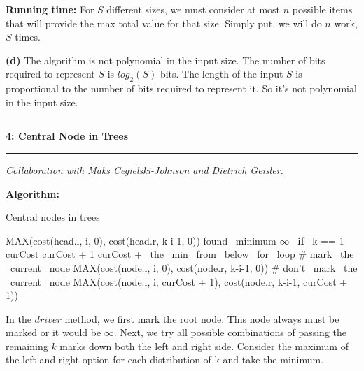 \documentclass[11pt]{article}
\newcommand\question[2]{\vspace{.25in}\hrule\textbf{#1: #2}\vspace{.5em}\hrule\vspace{.10in}}
\renewcommand\part[1]{\vspace{.10in}\textbf{(#1)}}
\newcommand\algorith{\vspace{.10in}\textbf{Algorithm: }}
\newcommand\runtime{\vspace{.10in}\textbf{Running time: }}
\begin{document}
\runtime For $S$ different sizes, we must consider at most $n$ possible items that will provide the max total value for that size. Simply put, we will do $n$ work, $S$ times.


\part{d} The algorithm is not polynomial in the input size. The number of bits required to represent $S$ is $log_2(S)$ bits. The length of the input $S$ is proportional to the number of bits required to represent it. So it's not polynomial in the input size.


\question{4}{Central Node in Trees}
\textit{Collaboration with Maks Cegielski-Johnson and Dietrich Geisler.}

\algorith

\begin{algorithm}[H]
\caption{Central nodes in trees}
\label{CHalgorithm}
\begin{algorithmic}[1]
	\State MAX(cost(head.l, i, 0), cost(head.r, k-i-1, 0))
\EndFor
\State \Return found \ minimum
\EndProcedure
\State
{}
		\State \Return $\infty$
	\Else \ \textbf{if} \ k == 1
		\State \Return curCost
	\EndIf
	\State \Return curCost + 1
\EndIf
\State
\State \Return curCost + \ the \ min \ from \ below \ for \ loop
	 \# mark \ the \ current \ node
		\State MAX(cost(node.l, i, 0), cost(node.r, k-i-1, 0))
	\EndFor
	 \# don't \ mark \ the \ current \ node
		\State MAX(cost(node.l, i, curCost + 1), cost(node.r, k-i-1, curCost + 1))
	\EndFor
\EndFor
\EndProcedure

\end{algorithmic}
\end{algorithm}

In the $driver$ method, we first mark the root node. This node always must be marked or it would be $\infty$. Next, we try all possible combinations of passing the remaining $k$ marks down both the left and right side. Consider the maximum of the left and right option for each distribution of k and take the minimum. 
\end{document}
